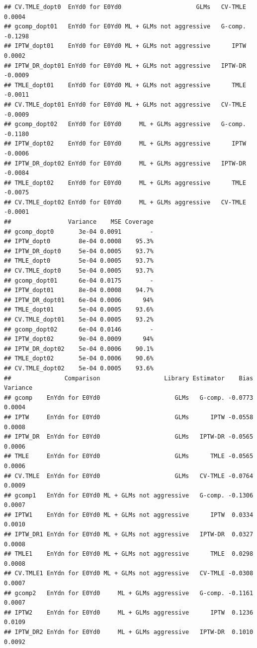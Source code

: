 \documentclass[11pt]{article}\usepackage[]{graphicx}\usepackage[]{color}
\makeatletter
\newenvironment{kframe}{%
 \def\at@end@of@kframe{}%
 \ifinner\ifhmode%
  \def\at@end@of@kframe{\end{minipage}}%
  \begin{minipage}{\columnwidth}%
 \fi\fi%
 \def\FrameCommand##1{\hskip\@totalleftmargin \hskip-\fboxsep
 \colorbox{shadecolor}{##1}\hskip-\fboxsep
     \hskip-\linewidth \hskip-\@totalleftmargin \hskip\columnwidth}%
 \MakeFramed {\advance\hsize-\width
   \@totalleftmargin\z@ \linewidth\hsize
   \@setminipage}}%
 {\par\unskip\endMakeFramed%
 \at@end@of@kframe}
\newenvironment{knitrout}{}{} %
\makeatother
\begin{document}
\begin{knitrout}
\begin{kframe}
\begin{verbatim}
## CV.TMLE_dopt0  EnYd0 for E0Yd0                     GLMs   CV-TMLE  0.0004
## gcomp_dopt01   EnYd0 for E0Yd0 ML + GLMs not aggressive   G-comp. -0.1298
## IPTW_dopt01    EnYd0 for E0Yd0 ML + GLMs not aggressive      IPTW  0.0002
## IPTW_DR_dopt01 EnYd0 for E0Yd0 ML + GLMs not aggressive   IPTW-DR -0.0009
## TMLE_dopt01    EnYd0 for E0Yd0 ML + GLMs not aggressive      TMLE -0.0011
## CV.TMLE_dopt01 EnYd0 for E0Yd0 ML + GLMs not aggressive   CV-TMLE -0.0009
## gcomp_dopt02   EnYd0 for E0Yd0     ML + GLMs aggressive   G-comp. -0.1180
## IPTW_dopt02    EnYd0 for E0Yd0     ML + GLMs aggressive      IPTW -0.0006
## IPTW_DR_dopt02 EnYd0 for E0Yd0     ML + GLMs aggressive   IPTW-DR -0.0084
## TMLE_dopt02    EnYd0 for E0Yd0     ML + GLMs aggressive      TMLE -0.0075
## CV.TMLE_dopt02 EnYd0 for E0Yd0     ML + GLMs aggressive   CV-TMLE -0.0001
##                Variance    MSE Coverage
## gcomp_dopt0       3e-04 0.0091        -
## IPTW_dopt0        8e-04 0.0008    95.3%
## IPTW_DR_dopt0     5e-04 0.0005    93.7%
## TMLE_dopt0        5e-04 0.0005    93.7%
## CV.TMLE_dopt0     5e-04 0.0005    93.7%
## gcomp_dopt01      6e-04 0.0175        -
## IPTW_dopt01       8e-04 0.0008    94.7%
## IPTW_DR_dopt01    6e-04 0.0006      94%
## TMLE_dopt01       5e-04 0.0005    93.6%
## CV.TMLE_dopt01    5e-04 0.0005    93.2%
## gcomp_dopt02      6e-04 0.0146        -
## IPTW_dopt02       9e-04 0.0009      94%
## IPTW_DR_dopt02    5e-04 0.0006    90.1%
## TMLE_dopt02       5e-04 0.0006    90.6%
## CV.TMLE_dopt02    5e-04 0.0005    93.6%
##               Comparison                  Library Estimator    Bias Variance
## gcomp    EnYdn for E0Yd0                     GLMs   G-comp. -0.0773   0.0004
## IPTW     EnYdn for E0Yd0                     GLMs      IPTW -0.0558   0.0008
## IPTW_DR  EnYdn for E0Yd0                     GLMs   IPTW-DR -0.0565   0.0006
## TMLE     EnYdn for E0Yd0                     GLMs      TMLE -0.0565   0.0006
## CV.TMLE  EnYdn for E0Yd0                     GLMs   CV-TMLE -0.0764   0.0009
## gcomp1   EnYdn for E0Yd0 ML + GLMs not aggressive   G-comp. -0.1306   0.0007
## IPTW1    EnYdn for E0Yd0 ML + GLMs not aggressive      IPTW  0.0334   0.0010
## IPTW_DR1 EnYdn for E0Yd0 ML + GLMs not aggressive   IPTW-DR  0.0327   0.0008
## TMLE1    EnYdn for E0Yd0 ML + GLMs not aggressive      TMLE  0.0298   0.0008
## CV.TMLE1 EnYdn for E0Yd0 ML + GLMs not aggressive   CV-TMLE -0.0308   0.0007
## gcomp2   EnYdn for E0Yd0     ML + GLMs aggressive   G-comp. -0.1161   0.0007
## IPTW2    EnYdn for E0Yd0     ML + GLMs aggressive      IPTW  0.1236   0.0109
## IPTW_DR2 EnYdn for E0Yd0     ML + GLMs aggressive   IPTW-DR  0.1010   0.0092

\end{verbatim}
\end{kframe}
\end{knitrout}
\end{document}
